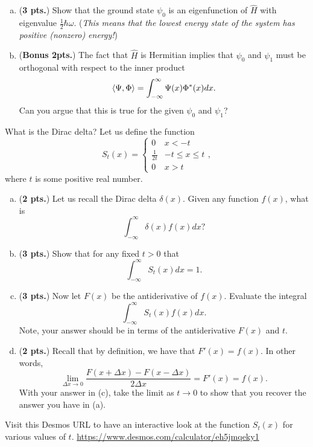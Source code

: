 \documentclass[12pt]{amsbook}
\begin{document}
\begin{problem}
\begin{enumerate}[(a)]
	\item (\textbf{3 pts.}) Show that the ground state $\psi_0$ is an eigenfunction of $\hat{H}$ with eigenvalue $\frac{1}{2} \hbar \omega$. (\textit{This means that the lowest energy state of the system has positive (nonzero) energy!})
	
	\item (\textbf{Bonus 2pts.}) The fact that $\hat{H}$ is Hermitian implies that $\psi_0$ and $\psi_1$ must be orthogonal with respect to the inner product
	\[
	\left\langle \Psi, \Phi\right\rangle = \int_{-\infty}^\infty \Psi(x)\Phi^*(x)dx.
	\]
	Can you argue that this is true for the given $\psi_0$ and $\psi_1$?
	\end{enumerate}
\end{problem}

\newpage
\begin{problem}
What is the Dirac delta? Let us define the function 
\[
S_t(x) = \begin{cases} 0 & x< -t \\ \frac{1}{2t} & -t\leq x \leq t \\ 0 & x>t \end{cases},
\]
where $t$ is some positive real number.
\begin{enumerate}[(a)]
	\item (\textbf{2 pts.}) Let us recall the Dirac delta $\delta(x)$. Given any function $f(x)$, what is
	\[
	\int_{-\infty}^\infty \delta(x) f(x)dx?
	\]
	\item (\textbf{3 pts.}) Show that for any fixed $t>0$ that 
	\[
	\int_{-\infty}^{\infty} S_t(x)dx = 1.
	\]
	\item (\textbf{3 pts.}) Now let $F(x)$ be the antiderivative of $f(x)$.  Evaluate the integral
	\[
	\int_{-\infty}^\infty S_t(x)f(x)dx.
	\]
	Note, your answer should be in terms of the antiderivative $F(x)$ and $t$.
	\item (\textbf{2 pts.}) Recall that by definition, we have that $F'(x)=f(x)$.  In other words,
	\[
	\lim_{\Delta x \to 0} \frac{F(x+\Delta x)-F(x-\Delta x)}{2\Delta x} = F'(x) = f(x).
	\]
	With your answer in (c), take the limit as $t\to 0$ to show that you recover the answer you have in (a).
\end{enumerate}
Visit this Desmos URL to have an interactive look at the function $S_t(x)$ for various values of $t$.  \url{https://www.desmos.com/calculator/eh5jmqeky1}
\end{problem}
\end{document}
